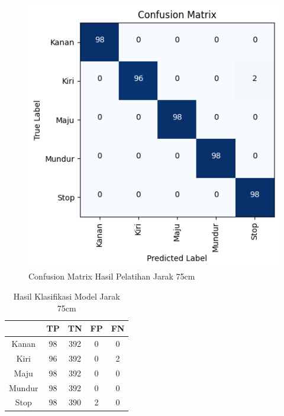\begin{figure} [H] \centering
  \includegraphics[scale=0.8]{gambar/75confusion.png}
  \caption{Confusion Matrix Hasil Pelatihan Jarak 75cm}
  \label{fig:ConfusionMatrixHasilPelatihanJarak75cm}
\end{figure}



\begin{table}[H]
  \centering
  \caption{Hasil Klasifikasi Model Jarak 75cm}
  \label{tb:Hasil Klasifikasi Jarak 75cm}
\begin{tabular}{|c|c|c|c|c|}
  \hline
  \rowcolor[HTML]{C0C0C0} 
  \cellcolor[HTML]{C0C0C0} & TP & TN  & FP & FN \\ \hline
  Kanan                    & 98 & 392 & 0  & 0  \\ \hline
  Kiri                     & 96 & 392 & 0  & 2  \\ \hline
  Maju                     & 98 & 392 & 0  & 0  \\ \hline
  Mundur                   & 98 & 392 & 0  & 0  \\ \hline
  Stop                     & 98 & 390 & 2  & 0  \\ \hline
  \end{tabular}
  \end{table}


